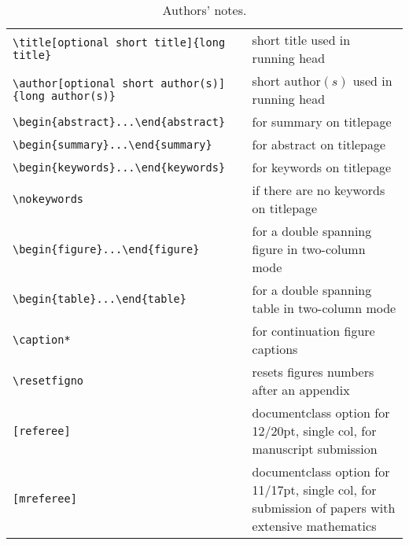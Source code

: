 \begin{table*}
\begin{minipage}{130mm}
\caption{Authors' notes.}\label{authors}
\begin{tabular}{@{}ll}
\verb"\title[optional short title]{long title}"
                    & short title used in running head\\
\verb"\author[optional short author(s)]{long author(s)}"
                    & short author$(s)$ used in running head\\
\verb"\begin{abstract}...\end{abstract}"& for summary on titlepage\\
\verb"\begin{summary}...\end{summary}"& for abstract on titlepage\\
\verb"\begin{keywords}...\end{keywords}"& for keywords on titlepage\\
\verb"\nokeywords"  & if there are no keywords on titlepage\\
\verb"\begin{figure*}...\end{figure*}" & for a double spanning figure in two-column mode\\
\verb"\begin{table*}...\end{table*}" & for a double spanning table in
                                       two-column mode\\
\verb"\caption*"    & for continuation figure captions\\
\verb"\resetfigno" & resets figures numbers after an appendix\\
\verb"[referee]" & documentclass option for 12/20pt, single col,
                   for manuscript submission\\
\verb"[mreferee]" & documentclass option for 11/17pt, single col,
                   for submission of papers with extensive mathematics\\
\end{tabular}
\end{minipage}
\end{table*}
%
